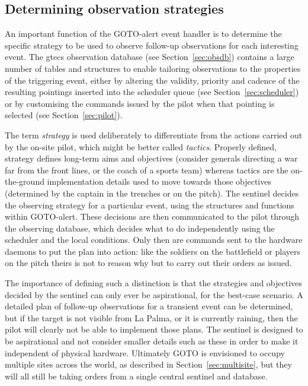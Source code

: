 \begin{colsection}
\subsection{Determining observation strategies}
\label{sec:event_strategy}
\begin{colsection}

An important function of the GOTO-alert event handler is to determine the specific strategy to be used to observe follow-up observations for each interesting event. The \gls{gtecs} observation database (see Section~\ref{sec:obsdb}) contains a large number of tables and structures to enable tailoring observations to the properties of the triggering event, either by altering the validity, priority and cadence of the resulting pointings inserted into the scheduler queue (see Section~\ref{sec:scheduler}) or by customising the commands issued by the pilot when that pointing is selected (see Section~\ref{sec:pilot}).

The term \textit{strategy} is used deliberately to differentiate from the actions carried out by the on-site pilot, which might be better called \textit{tactics}. Properly defined, strategy defines long-term aims and objectives (consider generals directing a war far from the front lines, or the coach of a sports team) whereas tactics are the on-the-ground implementation details used to move towards those objectives (determined by the captain in the trenches or on the pitch). The sentinel decides the observing strategy for a particular event, using the structures and functions within GOTO-alert. These decisions are then communicated to the pilot through the observing database, which decides what to do independently using the scheduler and the local conditions. Only then are commands sent to the hardware daemons to put the plan into action: like the soldiers on the battlefield or players on the pitch theirs is not to reason why but to carry out their orders as issued.

The importance of defining such a distinction is that the strategies and objectives decided by the sentinel can only ever be aspirational, for the best-case scenario. A detailed plan of follow-up observations for a transient event can be determined, but if the target is not visible from La Palma, or it is currently raining, then the pilot will clearly not be able to implement those plans. The sentinel is designed to be aspirational and not consider smaller details such as these in order to make it independent of physical hardware. Ultimately GOTO is envisioned to occupy multiple sites across the world, as described in Section~\ref{sec:multisite}, but they will all still be taking orders from a single central sentinel and database.


\end{colsection}
\end{colsection}
